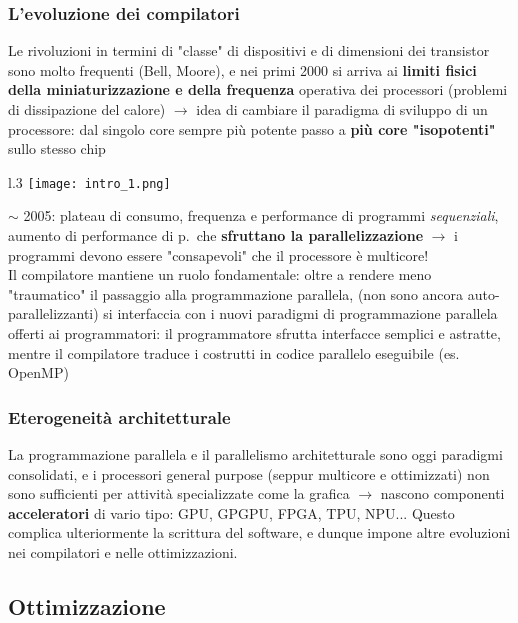 \subsubsection{L'evoluzione dei compilatori}

Le rivoluzioni in termini di "classe" di dispositivi e di dimensioni dei transistor sono molto frequenti (Bell, Moore), e nei primi 2000 si arriva ai \textbf{limiti fisici della miniaturizzazione e della frequenza} operativa dei processori (problemi di dissipazione del calore) $\rightarrow$ idea di cambiare il paradigma di sviluppo di un processore: dal singolo core sempre pi\`u potente passo a \textbf{pi\`u core "isopotenti"} sullo stesso chip
\begin{wrapfigure}{l}{.3\textwidth}
  \centering
\texttt{[image: intro\_1.png]}
\end{wrapfigure}

\noindent$\sim$ 2005: plateau di consumo, frequenza e performance di programmi \textit{sequenziali}, aumento di performance di p.~che \textbf{sfruttano la parallelizzazione} $\rightarrow$ i programmi devono essere "consapevoli" che il processore \`e multicore!\\
Il compilatore mantiene un ruolo fondamentale: oltre a rendere meno "traumatico" il passaggio alla programmazione parallela, (non sono ancora auto-parallelizzanti) si interfaccia con i nuovi paradigmi di programmazione parallela offerti ai programmatori: il programmatore sfrutta interfacce semplici e astratte, mentre il compilatore traduce i costrutti in codice parallelo eseguibile (es. OpenMP)

\subsubsection{Eterogeneit\`a architetturale}

La programmazione parallela e il parallelismo architetturale sono oggi paradigmi consolidati, e i processori general purpose (seppur multicore e ottimizzati) non sono sufficienti per attivit\`a specializzate come la grafica $\rightarrow$ nascono componenti \textbf{acceleratori} di vario tipo: GPU, GPGPU, FPGA, TPU, NPU...
Questo complica ulteriormente la scrittura del software, e dunque impone altre evoluzioni nei compilatori e nelle ottimizzazioni.

\subsection{Ottimizzazione}

